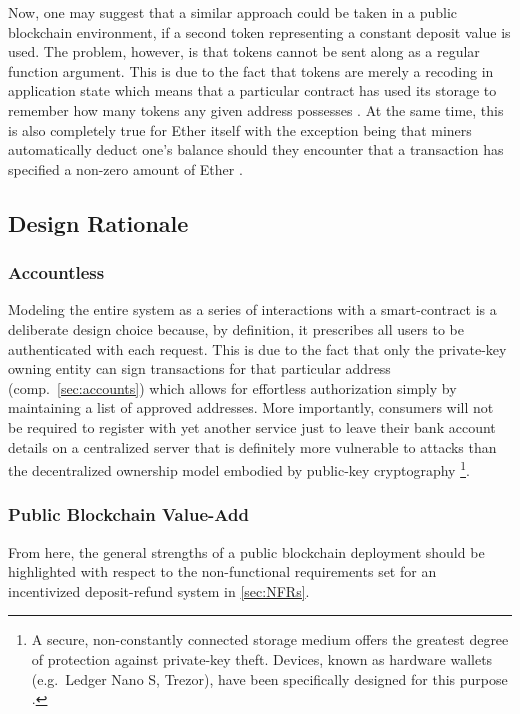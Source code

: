 \begin{description}
	Now, one may suggest that a similar approach could be taken in a public blockchain environment, if a second token representing a constant deposit value is used. The problem, however, is that tokens cannot be sent along as a regular function argument. This is due to the fact that tokens are merely a recoding in application state which means that a particular contract has used its storage to remember how many tokens any given address possesses \cite{}. At the same time, this is also completely true for Ether itself with the exception being that miners automatically deduct one's balance should they encounter that a transaction has specified a non-zero amount of Ether \cite{}.
\end{description}

\subsection{Design Rationale}
\subsubsection{Accountless}
Modeling the entire system as a series of interactions with a smart-contract is a deliberate design choice because, by definition, it prescribes all users to be authenticated with each request. This is due to the fact that only the private-key owning entity can sign transactions for that particular address (comp.~\ref{sec:accounts}) which allows for effortless authorization simply by maintaining a list of approved addresses. More importantly, consumers will not be required to register with yet another service just to leave their bank account details on a centralized server that is definitely more vulnerable to attacks than the decentralized ownership model embodied by public-key cryptography \footnote{A secure, non-constantly connected storage medium offers the greatest degree of protection against private-key theft. Devices, known as hardware wallets (e.g.~Ledger Nano S, Trezor), have been specifically designed for this purpose \cite{}.}. 

\subsubsection{Public Blockchain Value-Add}
From here, the general strengths of a public blockchain deployment should be highlighted with respect to the non-functional requirements set for an incentivized deposit-refund system in \autoref{sec:NFRs}.

